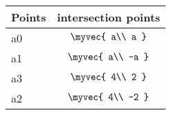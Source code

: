 {
\setlength\extrarowheight{5pt}
\begin{tabular}{|l|c|}
    \hline 
    \textbf{Points} & \textbf{intersection points} \\ \hline
   a0 & $\myvec{
   a\\
   a
   } $ \\\hline
   a1 & $\myvec{
   a\\
   -a
   } $ \\\hline
    
   a3 & $\myvec{
   4\\
   2
   } $ \\\hline
   a2 & $\myvec{
   4\\
   -2
   } $ \\\hline
      
      \end{tabular}
}


\fi

